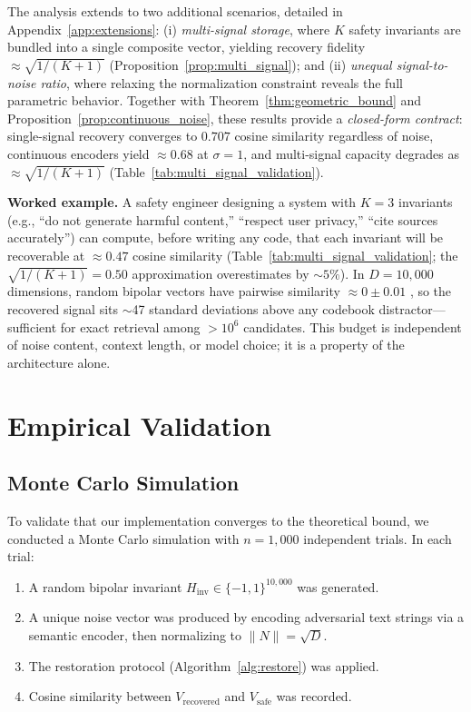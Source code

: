 \documentclass[a4paper,11pt]{article}
\begin{document}
The analysis extends to two additional scenarios, detailed in Appendix~\ref{app:extensions}: (i) \textit{multi-signal storage}, where $K$ safety invariants are bundled into a single composite vector, yielding recovery fidelity $\approx \sqrt{1/(K+1)}$ (Proposition~\ref{prop:multi_signal}); and (ii) \textit{unequal signal-to-noise ratio}, where relaxing the normalization constraint reveals the full parametric behavior. Together with Theorem~\ref{thm:geometric_bound} and Proposition~\ref{prop:continuous_noise}, these results provide a \textit{closed-form contract}: single-signal recovery converges to $0.707$ cosine similarity regardless of noise, continuous encoders yield $\approx 0.68$ at $\sigma = 1$, and multi-signal capacity degrades as $\approx\!\sqrt{1/(K+1)}$ (Table~\ref{tab:multi_signal_validation}).

\textbf{Worked example.} A safety engineer designing a system with $K = 3$ invariants (e.g., ``do not generate harmful content,'' ``respect user privacy,'' ``cite sources accurately'') can compute, before writing any code, that each invariant will be recoverable at $\approx 0.47$ cosine similarity (Table~\ref{tab:multi_signal_validation}; the $\sqrt{1/(K{+}1)} = 0.50$ approximation overestimates by ${\sim}5\%$). In $D = 10{,}000$ dimensions, random bipolar vectors have pairwise similarity $\approx 0 \pm 0.01$ \cite{kanerva2009}, so the recovered signal sits $\sim$47 standard deviations above any codebook distractor---sufficient for exact retrieval among $>10^6$ candidates. This budget is independent of noise content, context length, or model choice; it is a property of the architecture alone.

\section{Empirical Validation}
\label{sec:empirical}

\subsection{Monte Carlo Simulation}
To validate that our implementation converges to the theoretical bound, we conducted a Monte Carlo simulation with $n = 1{,}000$ independent trials. In each trial:
\begin{enumerate}
    \item A random bipolar invariant $H_{\text{inv}} \in \{-1,1\}^{10{,}000}$ was generated.
    \item A unique noise vector was produced by encoding adversarial text strings via a semantic encoder, then normalizing to $\|N\| = \sqrt{D}$.
    \item The restoration protocol (Algorithm~\ref{alg:restore}) was applied.
    \item Cosine similarity between $V_{\text{recovered}}$ and $V_{\text{safe}}$ was recorded.
\end{enumerate}
\end{document}
